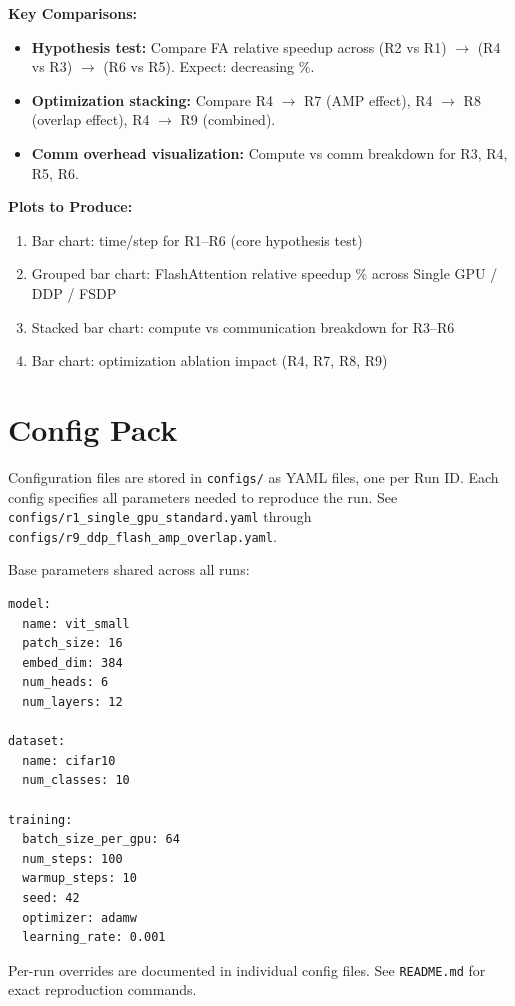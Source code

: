 \documentclass[12pt, a4paper]{article}
\begin{document}
\vspace{1em}
\textbf{Key Comparisons:}
\begin{itemize}
    \item \textbf{Hypothesis test:} Compare FA relative speedup across (R2 vs R1) $\rightarrow$ (R4 vs R3) $\rightarrow$ (R6 vs R5). Expect: decreasing \%.
    \item \textbf{Optimization stacking:} Compare R4 $\rightarrow$ R7 (AMP effect), R4 $\rightarrow$ R8 (overlap effect), R4 $\rightarrow$ R9 (combined).
    \item \textbf{Comm overhead visualization:} Compute vs comm breakdown for R3, R4, R5, R6.
\end{itemize}

\vspace{1em}
\textbf{Plots to Produce:}
\begin{enumerate}
    \item Bar chart: time/step for R1--R6 (core hypothesis test)
    \item Grouped bar chart: FlashAttention relative speedup \% across Single GPU / DDP / FSDP
    \item Stacked bar chart: compute vs communication breakdown for R3--R6
    \item Bar chart: optimization ablation impact (R4, R7, R8, R9)
\end{enumerate}

\section{Config Pack}

Configuration files are stored in \texttt{configs/} as YAML files, one per Run ID. Each config specifies all parameters needed to reproduce the run. See \texttt{configs/r1\_single\_gpu\_standard.yaml} through \texttt{configs/r9\_ddp\_flash\_amp\_overlap.yaml}.

\vspace{1em}
Base parameters shared across all runs:

\begin{verbatim}
model:
  name: vit_small
  patch_size: 16
  embed_dim: 384
  num_heads: 6
  num_layers: 12

dataset:
  name: cifar10
  num_classes: 10

training:
  batch_size_per_gpu: 64
  num_steps: 100
  warmup_steps: 10
  seed: 42
  optimizer: adamw
  learning_rate: 0.001
\end{verbatim}

Per-run overrides are documented in individual config files. See \texttt{README.md} for exact reproduction commands.
\end{document}
